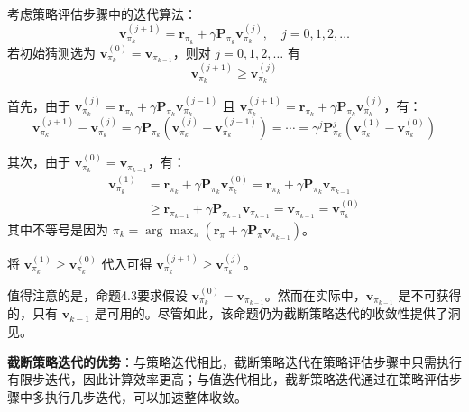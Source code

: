 \documentclass[UTF8]{article}
\begin{document}
\begin{theorembox}[4.3 价值改进]
    考虑策略评估步骤中的迭代算法：
    \[
    \boldsymbol{v}_{\pi_k}^{(j+1)} = \boldsymbol{r}_{\pi_k} + \gamma \boldsymbol{P}_{\pi_k} \boldsymbol{v}_{\pi_k}^{(j)}, \quad j = 0, 1, 2, \dots
    \]
    若初始猜测选为 $\boldsymbol{v}_{\pi_k}^{(0)} = \boldsymbol{v}_{\pi_{k-1}}$，则对 $j = 0, 1, 2, \dots$ 有
    \[
    \boldsymbol{v}_{\pi_k}^{(j+1)} \geq \boldsymbol{v}_{\pi_k}^{(j)}
    \]
\end{theorembox}

\begin{proofbox}
    首先，由于 $\boldsymbol{v}_{\pi_k}^{(j)} = \boldsymbol{r}_{\pi_k} + \gamma \boldsymbol{P}_{\pi_k} \boldsymbol{v}_{\pi_k}^{(j-1)}$ 且 $\boldsymbol{v}_{\pi_k}^{(j+1)} = \boldsymbol{r}_{\pi_k} + \gamma \boldsymbol{P}_{\pi_k} \boldsymbol{v}_{\pi_k}^{(j)}$，有：
    \[
    \boldsymbol{v}_{\pi_k}^{(j+1)} - \boldsymbol{v}_{\pi_k}^{(j)} = \gamma \boldsymbol{P}_{\pi_k} (\boldsymbol{v}_{\pi_k}^{(j)} - \boldsymbol{v}_{\pi_k}^{(j-1)}) = \cdots = \gamma^j \boldsymbol{P}_{\pi_k}^j (\boldsymbol{v}_{\pi_k}^{(1)} - \boldsymbol{v}_{\pi_k}^{(0)})
    \]

    其次，由于 $\boldsymbol{v}_{\pi_k}^{(0)} = \boldsymbol{v}_{\pi_{k-1}}$，有：
    \[
    \begin{aligned}
    \boldsymbol{v}_{\pi_k}^{(1)} &= \boldsymbol{r}_{\pi_k} + \gamma \boldsymbol{P}_{\pi_k} \boldsymbol{v}_{\pi_k}^{(0)}
    = \boldsymbol{r}_{\pi_k} + \gamma \boldsymbol{P}_{\pi_k} \boldsymbol{v}_{\pi_{k-1}} \\
    &\geq \boldsymbol{r}_{\pi_{k-1}} + \gamma \boldsymbol{P}_{\pi_{k-1}} \boldsymbol{v}_{\pi_{k-1}} = \boldsymbol{v}_{\pi_{k-1}} = \boldsymbol{v}_{\pi_k}^{(0)}
    \end{aligned}
    \]
    其中不等号是因为 $\pi_k = \arg\max_\pi (\boldsymbol{r}_\pi + \gamma \boldsymbol{P}_\pi \boldsymbol{v}_{\pi_{k-1}})$。

    将 $\boldsymbol{v}_{\pi_k}^{(1)} \geq \boldsymbol{v}_{\pi_k}^{(0)}$ 代入可得 $\boldsymbol{v}_{\pi_k}^{(j+1)} \geq \boldsymbol{v}_{\pi_k}^{(j)}$。
\end{proofbox}

值得注意的是，命题4.3要求假设 $\boldsymbol{v}_{\pi_k}^{(0)} = \boldsymbol{v}_{\pi_{k-1}}$。然而在实际中，$\boldsymbol{v}_{\pi_{k-1}}$ 是不可获得的，只有 $\boldsymbol{v}_{k-1}$ 是可用的。尽管如此，该命题仍为截断策略迭代的收敛性提供了洞见。

\textbf{截断策略迭代的优势}：与策略迭代相比，截断策略迭代在策略评估步骤中只需执行有限步迭代，因此计算效率更高；与值迭代相比，截断策略迭代通过在策略评估步骤中多执行几步迭代，可以加速整体收敛。
\end{document}
